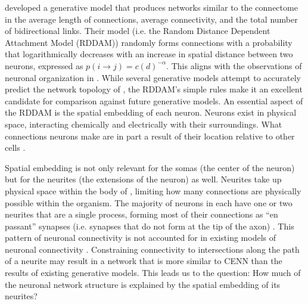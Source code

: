 \cite{Itzhack} developed a generative model that produces networks similar to the \ce connectome in the average length of connections, average connectivity, and the total number of bidirectional links. 
Their model (i.e. the Random Distance Dependent Attachment Model (RDDAM)) randomly forms connections with a probability that logarithmically decreases with an increase in spatial distance between two neurons, expressed as $p(i \rightarrow j)= c(d)^{-\alpha}$.
This aligns with the observations of neuronal organization in \ce \citep{PerezEscudero}.
While several generative models attempt to accurately predict the network topology of \ce \citep{Costa, Khajezade, Nicosia}, the RDDAM’s simple rules make it an excellent candidate for comparison against future generative models.
An essential aspect of the RDDAM is the spatial embedding of each neuron. 
Neurons exist in physical space, interacting chemically and electrically with their surroundings. 
What connections neurons make are in part a result of their location relative to other cells \citep{Hentschel, Kaiser, PerezEscudero}.

Spatial embedding is not only relevant for the somas (the center of the neuron) but for the neurites (the extensions of the neuron) as well. 
Neurites take up physical space within the body of \ce, limiting how many connections are physically possible within the organism. 
The majority of neurons in \ce each have one or two neurites that are a single process, forming most of their connections as “en passant” synapses (i.e. synapses that do not form at the tip of the axon) \citep{Durbin, White}. 
This pattern of neuronal connectivity is not accounted for in existing models of \ce neuronal connectivity \citep{Costa, Itzhack, Khajezade, Nicosia}. 
Constraining connectivity to intersections along the path of a neurite may result in a network that is more similar to CENN than the results of existing generative models. 
This leads us to the question: How much of the \ce neuronal network structure is explained by the spatial embedding of its neurites?